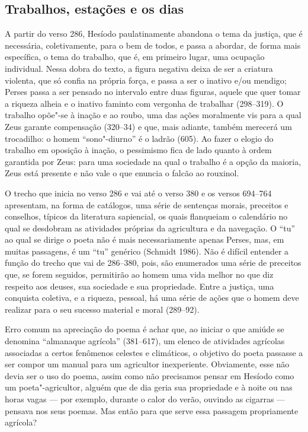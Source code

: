 \subsection{Trabalhos, estações e os dias}

A partir do verso 286, Hesíodo paulatinamente abandona o tema da
justiça, que é necessária, coletivamente, para o bem de todos, e passa a
abordar, de forma mais específica, o tema do trabalho, que é, em
primeiro lugar, uma ocupação individual. Nessa dobra do texto, a figura
negativa deixa de ser a criatura violenta, que só confia na própria
força, e passa a ser o inativo e/ou mendigo; Perses passa a ser pensado
no intervalo entre duas figuras, aquele que quer tomar a riqueza alheia
e o inativo faminto com vergonha de trabalhar (298--319). O trabalho
opõe"-se à inação e ao roubo, uma das ações moralmente vis para a qual
Zeus garante compensação (320--34) e que, mais adiante, também merecerá
um trocadilho: o homem ``sono"-diurno'' é o ladrão (605). Ao fazer o
elogio do trabalho em oposição à inação, o pessimismo fica de lado
quanto à ordem garantida por Zeus: para uma sociedade na qual o trabalho
é a opção da maioria, Zeus está presente e não vale o que enuncia o
falcão ao rouxinol.

O trecho que inicia no verso 286 e vai até o verso 380 e os versos
694--764 apresentam, na forma de catálogos, uma série de sentenças
morais, preceitos e conselhos, típicos da literatura sapiencial, os
quais flanqueiam o calendário no qual se desdobram as atividades
próprias da agricultura e da navegação. O ``tu'' ao qual se dirige o
poeta não é mais necessariamente apenas Perses, mas, em muitas
passagens, é um ``tu'' genérico (Schmidt 1986). Não é difícil entender a
função do trecho que vai de 286--380, pois, são enumerados uma série de
preceitos que, se forem seguidos, permitirão ao homem uma vida melhor no
que diz respeito aos deuses, sua sociedade e sua propriedade. Entre a
justiça, uma conquista coletiva, e a riqueza, pessoal, há uma série de
ações que o homem deve realizar para o seu sucesso material e moral
(289--92).

Erro comum na apreciação do poema é achar que, ao iniciar o que amiúde
se denomina ``almanaque agrícola'' (381--617), um elenco de atividades
agrícolas associadas a certos fenômenos celestes e climáticos, o
objetivo do poeta passasse a ser compor um manual para um agricultor
inexperiente. Obviamente, esse não devia ser o uso do poema, assim como
não precisamos pensar em Hesíodo como um poeta"-agricultor, alguém que de
dia geria sua propriedade e à noite ou nas horas vagas --- por exemplo,
durante o calor do verão, ouvindo as cigarras --- pensava nos seus
poemas. Mas então para que serve essa passagem propriamente agrícola?

